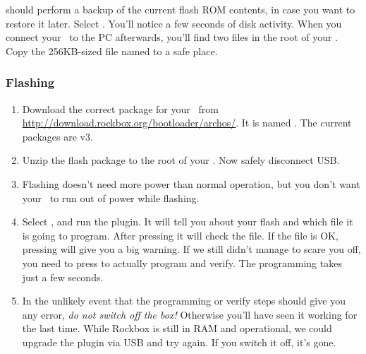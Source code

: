  should perform a
backup of the current flash ROM contents, in case you want to restore it later.
Select . You'll notice a few seconds of disk activity. When you connect your
\dap\ to the PC afterwards, you'll find two files in the root of your \dap.
Copy the 256KB-sized file named  to
a safe place.

\subsubsection{Flashing}

\begin{enumerate}
\item Download the correct package for your \dap\ from
  \url{http://download.rockbox.org/bootloader/archos/}. It is named
  .
  The current packages are v3.
\item Unzip the flash package to the root of your \dap.
  Now safely disconnect USB.
\item
  Flashing doesn't need more power than normal operation, but you don't want
  your \dap\ to run out of power while flashing.
\item Select , and run the
   plugin. It will tell you about your flash and
  which file it is going to program. After pressing
  it will check the file. If the file is OK, pressing
  will give you a big warning. If we still didn't manage to scare you off, you
  need to press 
  to actually program and verify. The programming takes just a few seconds.
\item In the unlikely event that the programming or verify steps should give
  you any error, \emph{do not switch off the box!} Otherwise you'll have seen
  it working for the last time. While Rockbox is still in RAM and operational,
  we could upgrade the plugin via USB and try again. If you switch it off,
  it's gone.
\end{enumerate}

